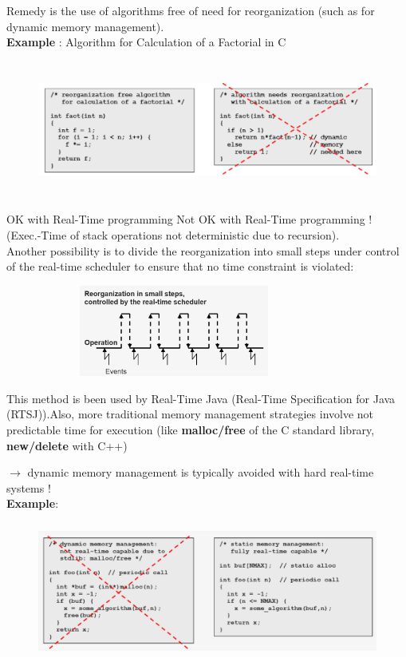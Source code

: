 Remedy is the use of algorithms free of need for reorganization (such as for dynamic memory management).\\
\newpage
\textbf{Example }: Algorithm for Calculation of a Factorial in C 

	\begin{figure}[h]
    \centering
    \includegraphics[width=14cm, height=4.5cm]{Images/image72.png}
    \label{fig:Fig 18}
    \end{figure}

OK with Real-Time programming   \hspace{1.5cm}   Not OK with Real-Time programming ! (Exec.-Time of stack  operations not deterministic due to recursion). \\

Another possibility is to divide the reorganization into small steps under control of the real-time scheduler to ensure that no time constraint is violated: 

	\begin{figure}[h]
    \centering
    \includegraphics[width=9cm, height=3cm]{Images/image73.png}
    \label{fig:Fig 19}
    \end{figure}
    
This method is been used by Real-Time Java (Real-Time Specification for Java (RTSJ)).Also, more traditional memory management strategies involve not predictable time for execution (like \textbf{malloc/free} of the C standard library, \textbf{new/delete} with C++)

$\rightarrow$ dynamic memory management is typically avoided with hard real-time systems !\\
\textbf{Example}:

	\begin{figure}[h]
    \centering
    \includegraphics[width=14cm, height=4.5cm]{Images/image74.png}
    \label{fig:Fig 20}
    \end{figure}
    
